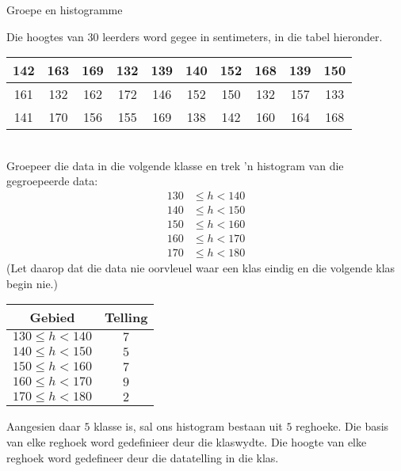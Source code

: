 \begin{wex}{Groepe en histogramme}
{Die hoogtes van $30$ leerders word gegee in sentimeters, in die tabel hieronder.
\\
    \begin{center}
      \begin{tabular}{|c|c|c|c|c|c|c|c|c|c|}\hline
   
        142 & 163 & 169 & 132 & 139 & 140 & 152 & 168 & 139 & 150\\ \hline
        161 & 132 & 162 & 172 & 146 & 152 & 150 & 132 & 157 & 133\\ \hline
        141 & 170 & 156 & 155 & 169 & 138 & 142 & 160 & 164 & 168\\\hline
 
      \end{tabular}
    \end{center}
\vspace {8pt}\\
    Groepeer die data in die volgende klasse en trek ’n histogram van die gegroepeerde data:
    \begin{align*}
      130 &\leq h < 140 \\
      140 &\leq h < 150 \\
      150 &\leq h < 160 \\
      160 &\leq h < 170 \\
      170 &\leq h < 180
    \end{align*}
    (Let daarop dat die data nie oorvleuel waar een klas eindig en die volgende klas begin nie.)
}{
  \begin{center}
    \begin{tabular}{|c|c|} \hline

      \textbf{Gebied} & \textbf{Telling} \\ \hline
    
      $130 \leq h < 140$ & $7$ \\ \hline
      $140 \leq h < 150$ & $5$ \\\hline
      $150 \leq h < 160$ & $7$ \\\hline
      $160 \leq h < 170$ & $9$ \\\hline
      $170 \leq h < 180$ & $2$ \\\hline

    \end{tabular}
  \end{center}
  

  Aangesien daar $5$ klasse is, sal ons histogram bestaan uit $5$ reghoeke. Die basis van elke reghoek word gedefinieer deur die klaswydte. Die hoogte van elke reghoek word gedefineer deur die datatelling in die klas.
  
}
\end{wex}
